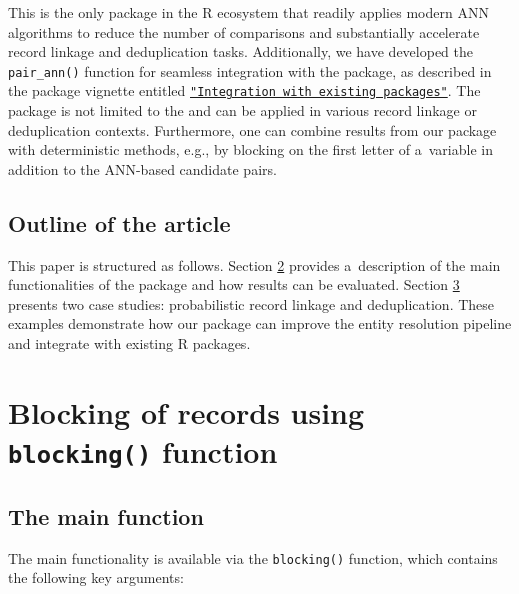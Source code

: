This is the only package in the R ecosystem that readily applies modern
ANN algorithms to reduce the number of comparisons and substantially
accelerate record linkage and deduplication tasks. Additionally, we have
developed the \texttt{pair\_ann()} function for seamless integration with the
 package, as described in the package vignette entitled
\href{https://cran.r-project.org/web/packages/blocking/vignettes/v3-integration.html}{\texttt{"Integration\ with\ existing\ packages"}}.
The  package is not limited to the
 and can be applied in various record linkage or
deduplication contexts. Furthermore, one can combine results from our package with deterministic methods, e.g., by blocking on the first letter of a~variable in addition to the ANN-based candidate pairs.

\subsection{Outline of the article}\label{outline-of-the-article}

This paper is structured as follows. Section \hyperref[sec-blocks]{2} provides a~description of the main functionalities of the 
package and how results can be evaluated. Section \hyperref[sec-case]{3}
presents two case studies: probabilistic record linkage and
deduplication. These examples demonstrate how our package can improve
the entity resolution pipeline and integrate with existing R packages.

\section{\texorpdfstring{Blocking of records using \texttt{blocking()} function}{Blocking of records using blocking() function}}\label{sec-blocks}

\subsection{The main function}\label{the-main-function}

The main functionality is available via the \texttt{blocking()} function, which
contains the following key arguments:

